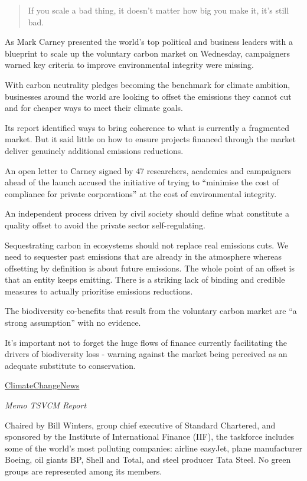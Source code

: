 \documentclass[
]{book}
\begin{document}
\begin{quote}
If you scale a bad thing, it doesn't matter how big you make it, it's still bad.
\end{quote}

As Mark Carney presented the world's top political and business leaders with a blueprint to scale up the voluntary carbon market on Wednesday, campaigners warned key criteria to improve environmental integrity were missing.

With carbon neutrality pledges becoming the benchmark for climate ambition, businesses around the world are looking to offset the emissions they cannot cut and for cheaper ways to meet their climate goals.

Its report identified ways to bring coherence to what is currently a fragmented market. But it said little on how to ensure projects financed through the market deliver genuinely additional emissions reductions.

An open letter to Carney signed by 47 researchers, academics and campaigners ahead of the launch accused the initiative of trying to ``minimise the cost of compliance for private corporations'' at the cost of environmental integrity.

An independent process driven by civil society should define what constitute a quality offset to avoid the private sector self-regulating.

Sequestrating carbon in ecosystems should not replace real emissions cuts.
We need to sequester past emissions that are already in the atmosphere whereas offsetting by definition is about future emissions. The whole point of an offset is that an entity keeps emitting. There is a striking lack of binding and credible measures to actually prioritise emissions reductions.

The biodiversity co-benefits that result from the voluntary carbon market are ``a strong assumption'' with no evidence.

It's important not to forget the huge flows of finance currently facilitating the drivers of biodiversity loss - warning against the market being perceived as an adequate substitute to conservation.

\href{https://www.climatechangenews.com/2021/01/27/carneys-carbon-offset-taskforce-ducks-environmental-integrity-questions/}{ClimateChangeNews}

\emph{Memo TSVCM Report}

Chaired by Bill Winters, group chief executive of Standard Chartered, and sponsored by the Institute of International Finance (IIF), the taskforce includes some of the world's most polluting companies: airline easyJet, plane manufacturer Boeing, oil giants BP, Shell and Total, and steel producer Tata Steel. No green groups are represented among its members.
\end{document}
